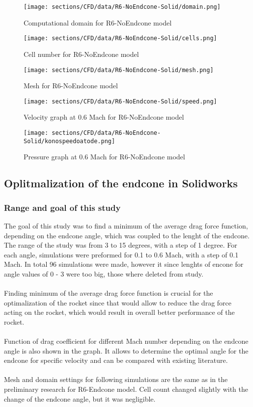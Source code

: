 \begin{figure}[H]
    \centering
    \texttt{[image: sections/CFD/data/R6-NoEndcone-Solid/domain.png]}
    \caption{Computational domain for R6-NoEndcone model}
\end{figure}
\begin{figure}[H]
    \centering
    \texttt{[image: sections/CFD/data/R6-NoEndcone-Solid/cells.png]}
    \caption{Cell number for R6-NoEndcone model}
\end{figure}

\begin{figure}[H]
    \centering
    \texttt{[image: sections/CFD/data/R6-NoEndcone-Solid/mesh.png]}
    \caption{Mesh for R6-NoEndcone model}
\end{figure}
\begin{figure}[H]
    \centering
    \texttt{[image: sections/CFD/data/R6-NoEndcone-Solid/speed.png]}
    \caption{Velocity graph at 0.6 Mach for R6-NoEndcone    model}
\end{figure}

\begin{figure}[H]
    \centering
    \texttt{[image: sections/CFD/data/R6-NoEndcone-Solid/konospeedoatode.png]}
    \caption{Pressure graph at 0.6 Mach for R6-NoEndcone model}
\end{figure}



\subsection{Oplitmalization of the endcone in Solidworks}
\subsubsection{Range and goal of this study}
The goal of this study was to find a minimum of the average drag force function, depending on
the endcone angle, which was coupled to the lenght of the endcone. The range of the
study was from 3 to 15 degrees, with a step of 1 degree. For each angle, simulations were preformed for 
0.1 to 0.6 Mach, with a step of 0.1 Mach. In total 96 simulations were made, however it since 
lenghts of encone for angle values of 0 - 3 were too big, those where deleted from study.\\\\
Finding minimum of the average drag force function is crucial for the optimalization of the rocket
since that would allow to reduce the drag force acting on the rocket, which would result in
overall better performance of the rocket.\\\\
Function of drag coefficient for different Mach number depending on the endcone angle is also 
shown in the graph. It allows to determine the optimal angle for the endcone for specific
velocity and can be compared with existing literature.\\\\
Mesh and domain settings for following simulations are the same as in the preliminary research for
R6-Endcone model. Cell count changed slightly with the change of the endcone angle, but it was
negligible.

